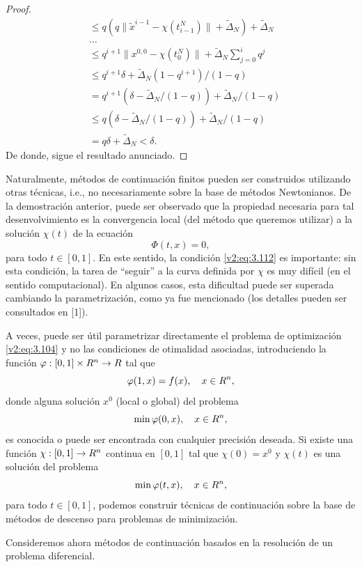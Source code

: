 \begin{proof}
\begin{align*}
        &\le q(q\|\tilde{x}^{i-1} - \chi(t_{i-1}^N)\| + \tilde{\Delta}_N) + \tilde{\Delta}_N \\
        &\dots \\
        &\le q^{i+1} \|x^{0,0} - \chi(t_0^N)\| + \tilde{\Delta}_N \sum_{j=0}^i q^j \\
        &\le q^{i+1} \delta + \tilde{\Delta}_N (1 - q^{i+1}) / (1 - q) \\
        &= q^{i+1} (\delta - \tilde{\Delta}_N / (1 - q)) + \tilde{\Delta}_N / (1 - q) \\
        &\le q(\delta - \tilde{\Delta}_N / (1 - q)) + \tilde{\Delta}_N / (1 - q) \\
        &= q\delta + \tilde{\Delta}_N < \delta.
    \end{align*}
    De donde, sigue el resultado anunciado.
\end{proof}

Naturalmente, métodos de continuación finitos pueden ser construidos utilizando otras técnicas, i.e., no necesariamente sobre la base de métodos Newtonianos. De la demostración anterior, puede ser observado que la propiedad necesaria para tal desenvolvimiento es la convergencia local (del método que queremos utilizar) a la solución $\chi(t)$ de la ecuación
\[
    \Phi(t, x) = 0,
\]
para todo $t \in [0, 1]$. En este sentido, la condición \eqref{v2:eq:3.112} es importante: sin esta condición, la tarea de ``seguir'' a la curva definida por $\chi$ es muy difícil (en el sentido computacional). En algunos casos, esta dificultad puede ser superada cambiando la parametrización, como ya fue mencionado (los detalles pueden ser consultados en [1]).

A veces, puede ser útil parametrizar directamente el problema de optimización \eqref{v2:eq:3.104} y no las condiciones de otimalidad asociadas, introduciendo la función $\varphi : [0, 1] \times R^n \to R$ tal que
\[
    \varphi(1, x) = f(x), \quad x \in R^n,
\]
donde alguna solución $x^0$ (local o global) del problema
\[
    \min \varphi(0, x), \quad x \in R^n,
\]
es conocida o puede ser encontrada con cualquier precisión deseada. Si existe una función $\chi : [0, 1] \to R^n$ continua en $[0, 1]$ tal que $\chi(0) = x^0$ y $\chi(t)$ es una solución del problema
\[
    \min \varphi(t, x), \quad x \in R^n,
\]
para todo $t \in [0, 1]$, podemos construir técnicas de continuación sobre la base de métodos de descenso para problemas de minimización.

Consideremos ahora métodos de continuación basados en la resolución de un problema diferencial.

